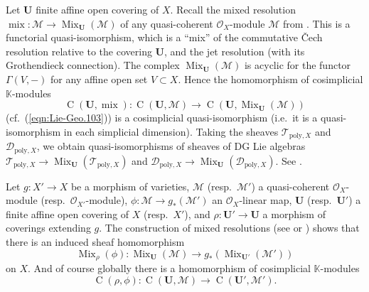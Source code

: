 \documentclass[a4paper, 10pt]{amsart}
\theoremstyle{definition}
\numberwithin{equation}{section}
\newcommand{\opn}{\operatorname}
\newcommand{\mcal}[1]{\mathcal{#1}}
\newcommand{\mrm}[1]{\mathrm{#1}}
\newcommand{\mbb}[1]{\mathbb{#1}}
\newcommand{\bsym}[1]{\boldsymbol{#1}}
\newcommand{\K}{\mbb{K}}
\begin{document}
Let $\bsym{U}$ finite affine open covering of $X$.
Recall the mixed resolution
$\opn{mix} : \mcal{M} \to \opn{Mix}_{\bsym{U}}(\mcal{M})$
of any quasi-coherent $\mcal{O}_X$-module $\mcal{M}$ 
from \cite[Section 6]{Ye1}. This is a functorial quasi-isomorphism, which is a
``mix'' of the commutative \v{C}ech resolution relative to the covering 
$\bsym{U}$, and the jet resolution (with its Grothendieck connection). 
The complex $\opn{Mix}_{\bsym{U}}(\mcal{M})$ is acyclic for the functor 
$\Gamma(V, -)$ for any affine open set $V \subset X$. 
Hence the homomorphism of cosimplicial $\K$-modules 
\[ \opn{C}(\bsym{U}, \opn{mix}) :
\opn{C}(\bsym{U}, \mcal{M}) \to 
\opn{C}(\bsym{U}, \opn{Mix}_{\bsym{U}}(\mcal{M})) \]
(cf.\ (\ref{eqn:Lie-Geo.103}))
is a cosimplicial quasi-isomorphism (i.e.\ it is a quasi-isomorphism in each
simplicial dimension).
Taking the sheaves $\mcal{T}_{\mrm{poly}, X}$ and $\mcal{D}_{\mrm{poly}, X}$,
we obtain quasi-isomorphisms of sheaves of DG Lie algebras
$\mcal{T}_{\mrm{poly}, X} \to  \opn{Mix}_{\bsym{U}}(\mcal{T}_{\mrm{poly}, X})$
and 
$\mcal{D}_{\mrm{poly}, X} \to  \opn{Mix}_{\bsym{U}}(\mcal{D}_{\mrm{poly}, X})$.
See \cite[Proposition 6.3]{Ye1}.

Let $g : X' \to X$ be a morphism of varieties, $\mcal{M}$ (resp.\ 
$\mcal{M}'$) a quasi-coherent $\mcal{O}_X$-module (resp.\ 
$\mcal{O}_{X'}$-module), $\phi : \mcal{M} \to g_* (\mcal{M}')$ an 
$\mcal{O}_X$-linear map, $\bsym{U}$ (resp.\ $\bsym{U}'$) a finite affine
open covering of $X$ (resp.\ $X'$), and 
$\rho : \bsym{U}' \to \bsym{U}$ a morphism of coverings extending $g$. 
The construction of mixed resolutions (see \cite[Section 6]{Ye1} or
\cite[Section 4]{Ye3}) shows that there is an induced sheaf homomorphism 
\[ \opn{Mix}_{\rho}(\phi) : \opn{Mix}_{\bsym{U}}(\mcal{M}) \to 
g_* (\opn{Mix}_{\bsym{U}'}(\mcal{M}')) \]
on $X$. 
And of course globally there is a homomorphism of cosimplicial $\K$-modules 
\[ \opn{C}(\rho, \phi) : \opn{C}(\bsym{U}, \mcal{M}) \to
\opn{C}(\bsym{U}', \mcal{M}') . \]
\end{document}
